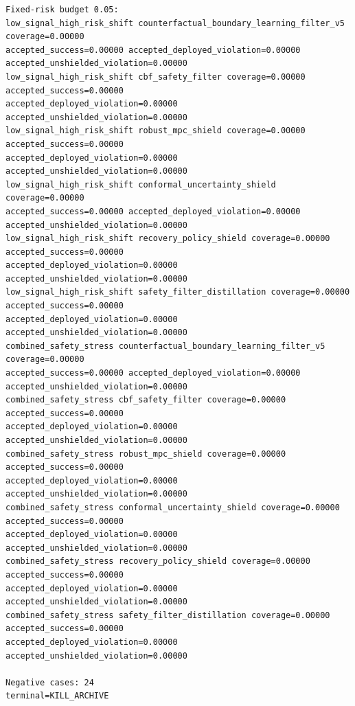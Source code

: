 \documentclass{article}
\begin{document}
\begin{tiny}
\begin{verbatim}
Fixed-risk budget 0.05:
low_signal_high_risk_shift counterfactual_boundary_learning_filter_v5 coverage=0.00000
accepted_success=0.00000 accepted_deployed_violation=0.00000
accepted_unshielded_violation=0.00000
low_signal_high_risk_shift cbf_safety_filter coverage=0.00000 accepted_success=0.00000
accepted_deployed_violation=0.00000 accepted_unshielded_violation=0.00000
low_signal_high_risk_shift robust_mpc_shield coverage=0.00000 accepted_success=0.00000
accepted_deployed_violation=0.00000 accepted_unshielded_violation=0.00000
low_signal_high_risk_shift conformal_uncertainty_shield coverage=0.00000
accepted_success=0.00000 accepted_deployed_violation=0.00000
accepted_unshielded_violation=0.00000
low_signal_high_risk_shift recovery_policy_shield coverage=0.00000 accepted_success=0.00000
accepted_deployed_violation=0.00000 accepted_unshielded_violation=0.00000
low_signal_high_risk_shift safety_filter_distillation coverage=0.00000 accepted_success=0.00000
accepted_deployed_violation=0.00000 accepted_unshielded_violation=0.00000
combined_safety_stress counterfactual_boundary_learning_filter_v5 coverage=0.00000
accepted_success=0.00000 accepted_deployed_violation=0.00000
accepted_unshielded_violation=0.00000
combined_safety_stress cbf_safety_filter coverage=0.00000 accepted_success=0.00000
accepted_deployed_violation=0.00000 accepted_unshielded_violation=0.00000
combined_safety_stress robust_mpc_shield coverage=0.00000 accepted_success=0.00000
accepted_deployed_violation=0.00000 accepted_unshielded_violation=0.00000
combined_safety_stress conformal_uncertainty_shield coverage=0.00000 accepted_success=0.00000
accepted_deployed_violation=0.00000 accepted_unshielded_violation=0.00000
combined_safety_stress recovery_policy_shield coverage=0.00000 accepted_success=0.00000
accepted_deployed_violation=0.00000 accepted_unshielded_violation=0.00000
combined_safety_stress safety_filter_distillation coverage=0.00000 accepted_success=0.00000
accepted_deployed_violation=0.00000 accepted_unshielded_violation=0.00000

Negative cases: 24
terminal=KILL_ARCHIVE
\end{verbatim}
\end{tiny}




\end{document}
